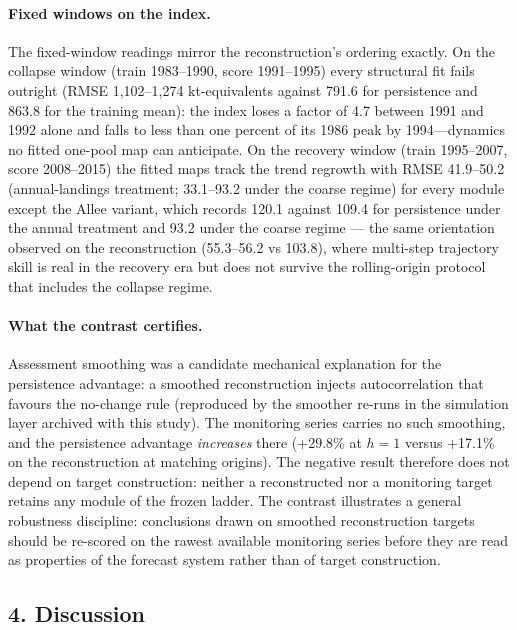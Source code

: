 \documentclass[11pt]{article}
\begin{document}
\paragraph{Fixed windows on the
index.}\label{fixed-windows-on-the-index.}

The fixed-window readings mirror the reconstruction's ordering exactly.
On the collapse window (train 1983--1990, score 1991--1995) every
structural fit fails outright (RMSE 1,102--1,274 kt-equivalents against
791.6 for persistence and 863.8 for the training mean): the index loses
a factor of 4.7 between 1991 and 1992 alone and falls to less than one
percent of its 1986 peak by 1994---dynamics no fitted one-pool map can
anticipate. On the recovery window (train 1995--2007, score 2008--2015)
the fitted maps track the trend regrowth with RMSE 41.9--50.2
(annual-landings treatment; 33.1--93.2 under the coarse regime) for
every module except the Allee variant, which records 120.1 against 109.4
for persistence under the annual treatment and 93.2 under the coarse
regime --- the same orientation observed on the reconstruction
(55.3--56.2 vs 103.8), where multi-step trajectory skill is real in the
recovery era but does not survive the rolling-origin protocol that
includes the collapse regime.

\paragraph{What the contrast
certifies.}\label{what-the-contrast-certifies.}

Assessment smoothing was a candidate mechanical explanation for the
persistence advantage: a smoothed reconstruction injects autocorrelation
that favours the no-change rule (reproduced by the smoother re-runs in
the simulation layer archived with this study). The monitoring series
carries no such smoothing, and the persistence advantage
\emph{increases} there (+29.8\% at \(h=1\) versus +17.1\% on the
reconstruction at matching origins). The negative result therefore does
not depend on target construction: neither a reconstructed nor a
monitoring target retains any module of the frozen ladder. The contrast
illustrates a general robustness discipline: conclusions drawn on
smoothed reconstruction targets should be re-scored on the rawest
available monitoring series before they are read as properties of the
forecast system rather than of target construction.

\subsection{4. Discussion}\label{discussion}
\end{document}
